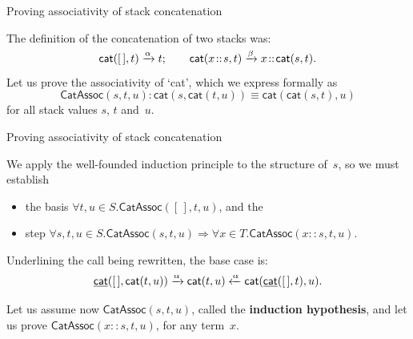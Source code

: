 \documentclass[compress,dvipdfmx]{beamer}
\newcommand\fun[1]{\textsf{#1}}
\newcommand\ufun[1]{\underline{\fun{#1}}}
\newcommand\el{[\,]}
\newcommand\cons[2]{{#1}\!::\!{#2}}
\newcommand\predName[1]{\textsf{#1}}
\newcommand\pred[2]{\predName{#1}({#2})}
\begin{document}
%
\begin{frame}{Proving associativity of stack concatenation}

The definition of the concatenation of two stacks was:
\begin{equation*}
\fun{cat}(        \el,t) \xrightarrow{\smash{\alpha}} t;\qquad
\fun{cat}(\cons{x}{s},t) \xrightarrow{\smash{\beta}}
\cons{x}{\fun{cat}(s,t)}.
\end{equation*}
Let us prove the associativity of `\fun{cat}', which we express
formally as
\begin{equation*}
  \pred{CatAssoc}{s,t,u} \colon
\fun{cat}(s,\fun{cat}(t,u)) \equiv
\fun{cat}(\fun{cat}(s,t),u)
\end{equation*}
for all stack values \(s\), \(t\) and~\(u\).

\end{frame}

%
\begin{frame}{Proving associativity of stack concatenation}

  We apply the well\hyp{}founded induction principle to the structure
  of~\(s\), so we must establish
  \begin{itemize}

    \item the basis \(\forall t,u \in S.\pred{CatAssoc}{\el,t,u}\), and the

    \item step \(\forall s,t,u \in S.\pred{CatAssoc}{s,t,u}
      \Rightarrow \forall x \in T.\pred{CatAssoc}{\cons{x}{s},t,u}\).

  \end{itemize}

  \bigskip

  Underlining the call being rewritten, the base case is:
  \begin{equation*}
    \ufun{cat}(\el,\fun{cat}(t,u))
    \xrightarrow{\smash{\alpha}} \fun{cat}(t,u)
    \xleftarrow{\smash{\alpha}} \fun{cat}(\ufun{cat}(\el,t),u).
  \end{equation*}

  Let us assume now \(\pred{CatAssoc}{s,t,u}\), called the
  \textbf{induction hypothesis}, and let us prove
  \(\pred{CatAssoc}{\cons{x}{s},t,u}\), for any term~\(x\).

\end{frame}
\end{document}

